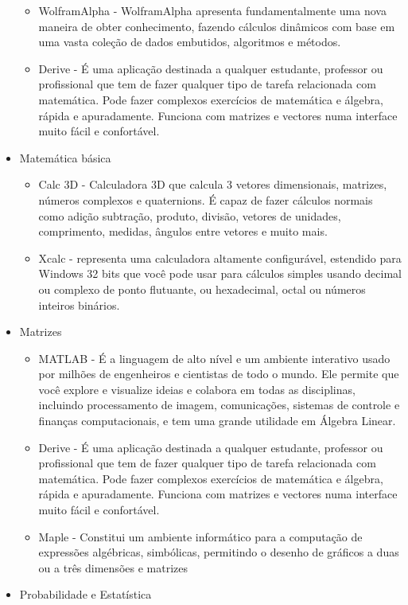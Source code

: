 \documentclass[12pt,a4paper]{article}
\begin{document}
\begin{itemize}
	\begin{itemize}
		\item  WolframAlpha - WolframAlpha apresenta fundamentalmente uma nova maneira de obter conhecimento, fazendo cálculos dinâmicos com base em uma vasta coleção de dados embutidos, algoritmos e métodos.
		\item Derive - É uma aplicação destinada a qualquer estudante, professor ou profissional que tem de fazer qualquer tipo de tarefa relacionada com matemática. Pode fazer complexos exercícios de matemática e álgebra, rápida e apuradamente. Funciona com matrizes e vectores numa interface muito fácil e confortável.
	\end{itemize}
	\item Matemática básica
	
	\begin{itemize}
		\item  Calc 3D -  Calculadora 3D que calcula 3 vetores dimensionais, matrizes, números complexos e quaternions. É capaz de fazer cálculos normais como adição subtração, produto, divisão, vetores de unidades, comprimento, medidas, ângulos entre vetores e muito mais.
		\item Xcalc - representa uma calculadora altamente configurável, estendido para Windows 32 bits que você pode usar para cálculos simples usando decimal ou complexo de ponto flutuante, ou hexadecimal, octal ou números inteiros binários.
	\end{itemize}
	\item Matrizes
	
	\begin{itemize}
		\item  MATLAB - É a linguagem de alto nível e um ambiente interativo usado por milhões de engenheiros e cientistas de todo o mundo. Ele permite que você explore e visualize ideias e colabora em todas as disciplinas, incluindo processamento de imagem, comunicações, sistemas de controle e finanças computacionais, e tem uma grande utilidade em Álgebra Linear.
		\item Derive - É uma aplicação destinada a qualquer estudante, professor ou profissional que tem de fazer qualquer tipo de tarefa relacionada com matemática. Pode fazer complexos exercícios de matemática e álgebra, rápida e apuradamente. Funciona com matrizes e vectores numa interface muito fácil e confortável.
		\item Maple - Constitui um ambiente informático para a computação de expressões algébricas, simbólicas, permitindo o desenho de gráficos a duas ou a três dimensões e matrizes
	\end{itemize}
	\item Probabilidade e Estatística
	

\end{itemize}
\end{document}
